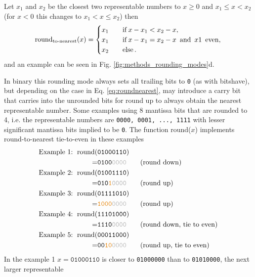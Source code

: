 Let $x_1$ and $x_2$ be the closest two representable numbers to $x \geq 0 $ and $x_1 \leq x < x_2$ (for $x<0$ this changes
to $x_1 < x \leq x_2$) then
\begin{equation}
\operatorname{round}_{\operatorname{to-nearest}}(x) =
\begin{cases}
x_1 \quad &\operatorname{if} x - x_1 < x_2 - x,  \\
x_1 &\operatorname{if} x-x_1 = x_2 - x \operatorname{~and~} x1 \operatorname{~even}, \\
x_2 &\operatorname{else}.
\end{cases}
\label{eq:roundnearest}
\end{equation}
and an example can be seen in Fig. \ref{fig:methods_rounding_modes}d.

In binary this rounding mode always sets all trailing bits to \texttt{0} (as with bitshave), but depending on the case in Eq. \ref{eq:roundnearest},
may introduce a carry bit that carries into the unrounded bits for round up to always obtain the nearest representable number.
Some examples using 8 mantissa bits that are rounded to 4, i.e. the representable numbers are \texttt{0000, 0001, ..., 1111}
with lesser significant mantissa bits implied to be \texttt{0}. The function round($x$) implements round-to-nearest tie-to-even
in these examples
\begin{align}
	\text{Example 1: }\op{round}(&\mathtt{01000110}) \nonumber \\
						= &\mathtt{0100{\color{gray}0000}} \qquad \text{(round down)} \nonumber \\
	\text{Example 2: }\op{round}(&\mathtt{01001110}) \nonumber \\
						= &\mathtt{010{\color{pregime}1}{\color{gray}0000}} \qquad \text{(round up)} \nonumber \\
	\text{Example 3: }\op{round}(&\mathtt{01111010}) \nonumber \\
						= &\mathtt{{\color{pregime}1000}{\color{gray}0000}} \qquad \text{(round up)} \nonumber \\
	\text{Example 4: }\op{round}(&\mathtt{11101000}) \nonumber \\
						= &\mathtt{1110{\color{gray}0000}} \qquad \text{(round down, tie to even)} \nonumber \\
	\text{Example 5: }\op{round}(&\mathtt{00011000}) \nonumber \\
						= &\mathtt{00{\color{pregime}10}{\color{gray}0000}} \qquad \text{(round up, tie to even)}					
	\label{eq:roundnearest_binary}
\end{align}
In the example 1 $x = \mathtt{01000110}$ is closer to \texttt{01000000} than to \texttt{01010000}, the next larger representable
